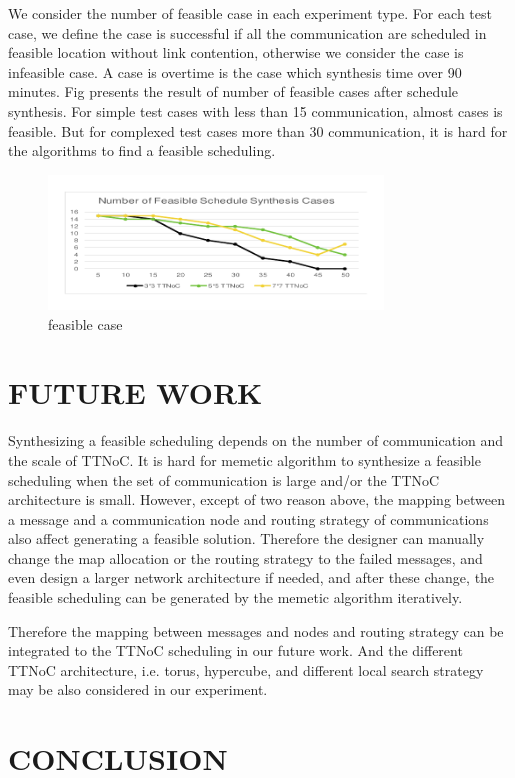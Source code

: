 \documentclass[conference]{IEEEtran}
\begin{document}
We consider the number of feasible  case in each experiment type. For each test case, we define the case is successful if all the communication are scheduled in feasible location without link contention, otherwise we consider the case is infeasible case. A case is overtime is the case which synthesis time over 90 minutes. Fig presents the result of number of feasible cases after schedule synthesis. For simple test cases with less than 15 communication, almost cases is feasible. But for complexed test cases more than 30 communication, it is hard for the algorithms to find a feasible scheduling.
\begin{figure}[!t]
	\centering
	\includegraphics[width=3.5in]{picture/feasible}
	\caption{feasible case}
	\label{f:feasible}
\end{figure}

\section{FUTURE WORK}

Synthesizing a feasible scheduling depends on the number of communication and the scale of TTNoC. It is hard for memetic algorithm to synthesize a feasible scheduling when the set of communication is large and/or the TTNoC architecture is small. However, except of two reason above, the mapping between a message and a communication node and routing strategy of communications also affect generating a feasible solution. Therefore the designer can manually change the map allocation or the routing strategy to the failed messages, and even design a larger network architecture if needed, and after these change, the feasible scheduling can be generated by the memetic algorithm iteratively. 

Therefore the mapping between messages and nodes and routing strategy can be integrated to the TTNoC scheduling in our future work. And the different TTNoC architecture, i.e. torus, hypercube, and different local search strategy may be also considered in our experiment.

\section{CONCLUSION}
\end{document}
